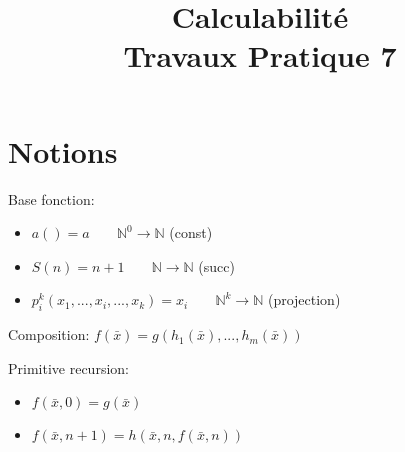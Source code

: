 \documentclass[a4paper,11pt,onecolumn]{article}
\title{Calculabilité\\Travaux Pratique 7}
\begin{document}
\maketitle

\section{Notions}

Base fonction:
\begin{itemize}
	\item $a() = a \;\;\;\;\;\;\; \mathbb{N}^0 \rightarrow \mathbb{N}$ (const)
	\item $S(n) = n+1 \;\;\;\;\;\;\; \mathbb{N} \rightarrow \mathbb{N}$ (succ)
	\item $p_i^k(x_1, ..., x_i, ..., x_k) = x_i \;\;\;\;\;\;\; \mathbb{N}^k \rightarrow \mathbb{N}$ (projection)
\end{itemize}

Composition: $f(\bar{x}) = g(h_1(\bar{x}), ..., h_m(\bar{x}))$

Primitive recursion:
\begin{itemize}
	\item $f(\bar{x}, 0) = g(\bar{x})$
	\item $f(\bar{x}, n+1) = h(\bar{x}, n, f(\bar{x}, n))$
\end{itemize}
\end{document}
